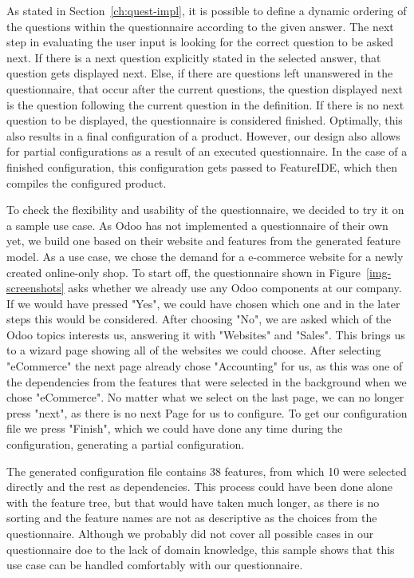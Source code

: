 As stated in Section~\ref{ch:quest-impl}, it is possible to define a dynamic ordering of the questions within the questionnaire according to the given answer. The next step in evaluating the user input is looking for the correct question to be asked next. If there is a next question explicitly stated in the selected answer, that question gets displayed next. Else, if there are questions left unanswered in the questionnaire, that occur after the current questions, the question displayed next is the question following the current question in the definition. If there is no next question to be displayed, the questionnaire is considered finished. Optimally, this also results in a final configuration of a product. However, our design also allows for partial configurations as a result of an executed questionnaire. In the case of a finished configuration, this configuration gets passed to FeatureIDE, which then compiles the configured product.

To check the flexibility and usability of the questionnaire, we decided to try it on a sample use case. As Odoo has not implemented a questionnaire of their own yet, we build one based on their website and features from the generated feature model. As a use case, we chose the demand for a e-commerce website for a newly created online-only shop. To start off, the questionnaire shown in Figure~\ref{img-screenshots} asks whether we already use any Odoo components at our company. If we would have pressed "Yes", we could have chosen which one and in the later steps this would be considered. After choosing "No", we are asked which of the Odoo topics interests us, answering it with "Websites" and "Sales". This brings us to a wizard page showing all of the websites we could choose. After selecting "eCommerce" the next page already chose "Accounting" for us, as this was one of the dependencies from the features that were selected in the background when we chose "eCommerce". No matter what we select on the last page, we can no longer press "next", as there is no next Page for us to configure. To get our configuration file we press "Finish", which we could have done any time during the configuration, generating a partial configuration.

The generated configuration file contains 38 features, from which 10 were selected directly and the rest as dependencies. This process could have been done alone with the feature tree, but that would have taken much longer, as there is no sorting and the feature names are not as descriptive as the choices from the questionnaire. Although we probably did not cover all possible cases in our questionnaire doe to the lack of domain knowledge, this sample shows that this use case can be handled comfortably with our questionnaire.



